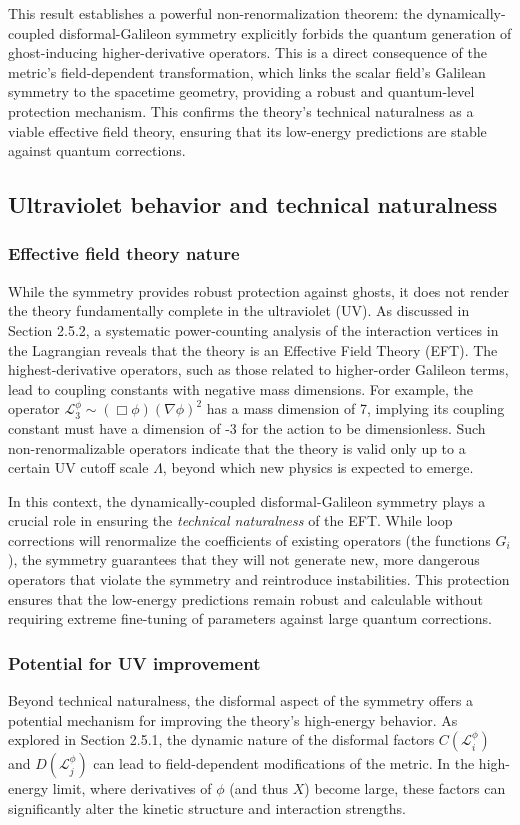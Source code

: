 \documentclass[twocolumn]{aastex631}
\begin{document}
This result establishes a powerful non-renormalization theorem: the dynamically-coupled disformal-Galileon symmetry explicitly forbids the quantum generation of ghost-inducing higher-derivative operators. This is a direct consequence of the metric's field-dependent transformation, which links the scalar field's Galilean symmetry to the spacetime geometry, providing a robust and quantum-level protection mechanism. This confirms the theory's technical naturalness as a viable effective field theory, ensuring that its low-energy predictions are stable against quantum corrections.

\subsection{Ultraviolet behavior and technical naturalness}

\subsubsection{Effective field theory nature}
While the symmetry provides robust protection against ghosts, it does not render the theory fundamentally complete in the ultraviolet (UV). As discussed in Section 2.5.2, a systematic power-counting analysis of the interaction vertices in the Lagrangian reveals that the theory is an Effective Field Theory (EFT). The highest-derivative operators, such as those related to higher-order Galileon terms, lead to coupling constants with negative mass dimensions. For example, the operator $\mathcal{L}_3^\phi \sim (\Box \phi) (\nabla\phi)^2$ has a mass dimension of 7, implying its coupling constant must have a dimension of -3 for the action to be dimensionless. Such non-renormalizable operators indicate that the theory is valid only up to a certain UV cutoff scale $\Lambda$, beyond which new physics is expected to emerge.

In this context, the dynamically-coupled disformal-Galileon symmetry plays a crucial role in ensuring the \textit{technical naturalness} of the EFT. While loop corrections will renormalize the coefficients of existing operators (the functions $G_i$), the symmetry guarantees that they will not generate new, more dangerous operators that violate the symmetry and reintroduce instabilities. This protection ensures that the low-energy predictions remain robust and calculable without requiring extreme fine-tuning of parameters against large quantum corrections.

\subsubsection{Potential for UV improvement}
Beyond technical naturalness, the disformal aspect of the symmetry offers a potential mechanism for improving the theory's high-energy behavior. As explored in Section 2.5.1, the dynamic nature of the disformal factors $C(\mathcal{L}_i^\phi)$ and $D(\mathcal{L}_j^\phi)$ can lead to field-dependent modifications of the metric. In the high-energy limit, where derivatives of $\phi$ (and thus $X$) become large, these factors can significantly alter the kinetic structure and interaction strengths.
\end{document}

